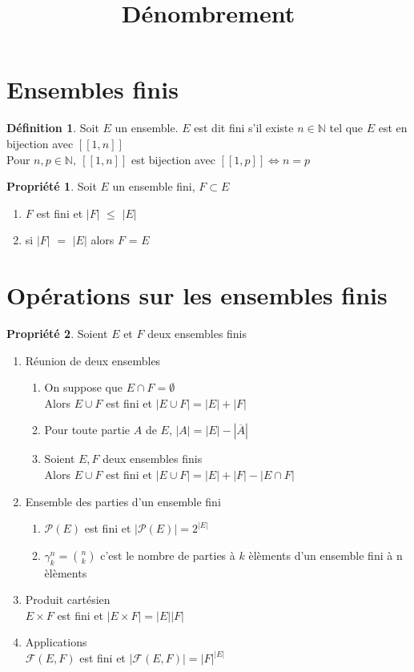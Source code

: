 \documentclass[fleqn]{article}
\title{D\'enombrement}
\date{}
\theoremstyle{definition} \newtheorem*{defi}{D\'efinition}
\theoremstyle{definition} \newtheorem*{theo}{Th\'eor\`eme}
\theoremstyle{definition} \newtheorem*{coro}{Corollaire}
\theoremstyle{remark} \newtheorem*{rqs}{Remarques}
\theoremstyle{definition} \newtheorem*{prop}{Propri\'et\'e}
\begin{document}
\maketitle

\section{Ensembles finis}
\begin{defi}
	Soit $E$ un ensemble. $E$ est dit fini s'il existe $n \in \mathbb{N}$ tel que $E$ est en bijection avec $[\![1,n]\!]$ \\
	Pour $n, p \in \mathbb{N},\ [\![1,n]\!]$ est bijection avec $[\![1,p]\!] \Leftrightarrow n = p$
\end{defi}

\begin{prop} Soit $E$ un ensemble fini, $F \subset E$
	\begin{enumerate}
		\item $F$ est fini et $|F|$ $\leq$ $|E|$
		\item si $|F|$ $=$ $|E|$ alors $F$ = $E$
	\end{enumerate}
\end{prop}

\section{Op\'erations sur les ensembles finis}
\begin{prop} Soient $E$ et $F$ deux ensembles finis
	\begin{enumerate}
		\item R\'eunion de deux ensembles
			\begin{enumerate}
				\item On suppose que $E \cap F = \emptyset$ \\
					Alors $E \cup F$ est fini et $|E \cup F| = |E| + |F|$
				\item Pour toute partie $A$ de $E$, $|A| = |E| - |\overline{A}|$
				\item Soient $E, F$ deux ensembles finis \\
					Alors $E\cup F$ est fini et $|E \cup F| = |E| + |F| - |E \cap F|$
			\end{enumerate}
		\item Ensemble des parties d'un ensemble fini
			\begin{enumerate}
			\item $\mathcal{P}(E)$ est fini et $|\mathcal{P}(E)| = 2^{|E|}$
			\item $\gamma_k^n = \binom{n}{k}$ c'est le nombre de parties \`a $k$ \`el\`ements d'un ensemble fini \`a n \`el\`ements
			\end{enumerate}
		\item Produit cart\'esien \\
			$E\times F$ est fini et $|E\times F| = |E||F|$
		\item Applications \\
			$\mathcal{F}(E,F)$ est fini et $|\mathcal{F}(E,F)| = |F|^{|E|}$
	\end{enumerate}
\end{prop}
\end{document}
